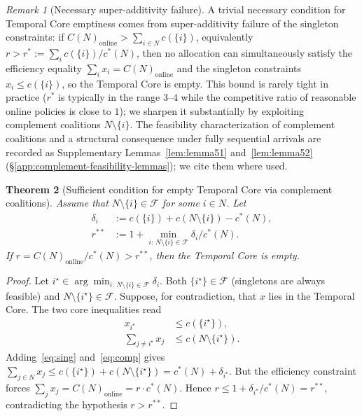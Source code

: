 \documentclass[11pt]{article}
\theoremstyle{plain}
\newtheorem{theorem}{Theorem}
\theoremstyle{definition}
\theoremstyle{remark}
\newtheorem{remark}[theorem]{Remark}
\newcommand{\F}{\mathcal{F}}
\newcommand{\cstar}{c^{\ast}}
\begin{document}
\begin{remark}[Necessary super-additivity failure]
\label{rem:remark1}
\label{rem:rstar}
A trivial necessary condition for Temporal Core emptiness comes from super-additivity failure of the singleton constraints: if $C(N)_{\text{online}} > \sum_{i\in N} c(\{i\})$, equivalently $r > r^{\ast} := \sum_i c(\{i\})/\cstar(N)$, then no allocation can simultaneously satisfy the efficiency equality $\sum_i x_i = C(N)_{\text{online}}$ and the singleton constraints $x_i \le c(\{i\})$, so the Temporal Core is empty. This bound is rarely tight in practice ($r^{\ast}$ is typically in the range $3$--$4$ while the competitive ratio of reasonable online policies is close to $1$); we sharpen it substantially by exploiting complement coalitions $N\setminus\{i\}$. The feasibility characterization of complement coalitions and a structural consequence under fully sequential arrivals are recorded as Supplementary Lemmas~\ref{lem:lemma51} and~\ref{lem:lemma52} (\S\ref{app:complement-feasibility-lemmas}); we cite them where used.
\end{remark}

\addtocounter{theorem}{3}
\begin{theorem}[Sufficient condition for empty Temporal Core via complement coalitions]
\label{thm:empty-core}
Assume that $N\setminus\{i\}\in\F$ for some $i\in N$. Let
\[
\begin{aligned}
\delta_i & := c(\{i\}) + c(N\setminus\{i\}) - \cstar(N), \\
r^{\ast\ast} & := 1 + \min_{i:\,N\setminus\{i\}\in\F} \delta_i/\cstar(N).
\end{aligned}
\]
If $r = C(N)_{\text{online}}/\cstar(N) > r^{\ast\ast}$, then the Temporal Core is empty.
\end{theorem}

\begin{proof}
Let $i^{\star}\in\arg\min_{i:\,N\setminus\{i\}\in\F} \delta_i$. Both $\{i^{\star}\}\in\F$ (singletons are always feasible) and $N\setminus\{i^{\star}\}\in\F$. Suppose, for contradiction, that $x$ lies in the Temporal Core. The two core inequalities read
\begin{align}
x_{i^{\star}} &\le c(\{i^{\star}\}), \label{eq:sing}\\
\sum_{j\neq i^{\star}} x_j &\le c(N\setminus\{i^{\star}\}).\label{eq:comp}
\end{align}
Adding~\eqref{eq:sing} and~\eqref{eq:comp} gives $\sum_{j\in N} x_j \le c(\{i^{\star}\}) + c(N\setminus\{i^{\star}\}) = \cstar(N) + \delta_{i^{\star}}$. But the efficiency constraint forces $\sum_j x_j = C(N)_{\text{online}} = r\cdot \cstar(N)$. Hence $r\le 1 + \delta_{i^{\star}}/\cstar(N) = r^{\ast\ast}$, contradicting the hypothesis $r>r^{\ast\ast}$.
\end{proof}
\end{document}
